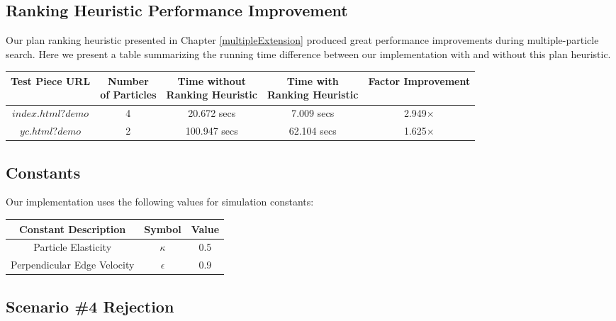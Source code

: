   \subsection{Ranking Heuristic Performance Improvement}

Our plan ranking heuristic presented in Chapter \ref{multipleExtension} produced great performance improvements during multiple-particle search. Here we present a table summarizing the running time difference between our implementation with and without this plan heuristic.

\begin{table}[H]\label{rankingHeuristicResults}
\centering
\def\arraystretch{1.5}
\begin{tabular}{|c|c|c|c|c|}
\hline
Test Piece URL & \specialcell{ Number \\ of Particles} & \specialcell{Time without \\ Ranking Heuristic} & \specialcell{Time with \\ Ranking Heuristic} & Factor Improvement \\ \hline
$index.html?demo$ & 4 & 20.672 secs & 7.009 secs & 2.949$\times$ \\ \hline
$yc.html?demo$ & 2 & 100.947 secs & 62.104 secs & 1.625$\times$ \\ \hline
\end{tabular}
\end{table}

  \subsection{Constants}

Our implementation uses the following values for simulation constants:

\begin{table}[H]\label{constantsTable}
\centering
\def\arraystretch{1.1}
\begin{tabular}{|c|c|c|}
\hline
Constant Description & Symbol & Value \\ \hline
Particle Elasticity & $\kappa$ & 0.5 \\
Perpendicular Edge Velocity & $\epsilon$ & 0.9\\ \hline
\end{tabular}
\end{table}


  \subsection{Scenario \#4 Rejection}

